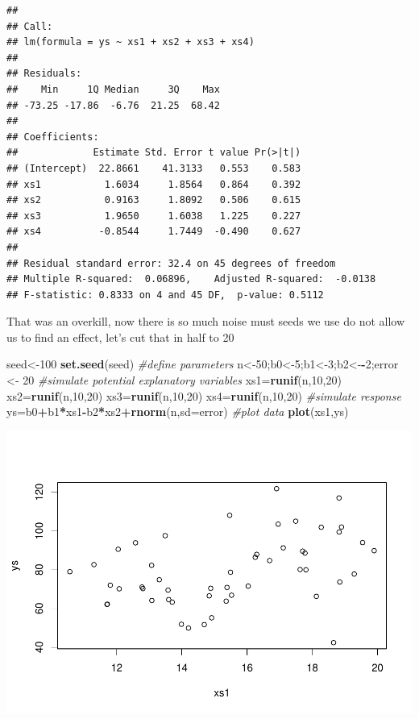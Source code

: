 \documentclass[
]{book}
\newenvironment{Shaded}{\begin{snugshade}}{\end{snugshade}}
\newcommand{\CommentTok}[1]{\textcolor[rgb]{0.56,0.35,0.01}{\textit{#1}}}
\newcommand{\DataTypeTok}[1]{\textcolor[rgb]{0.13,0.29,0.53}{#1}}
\newcommand{\DecValTok}[1]{\textcolor[rgb]{0.00,0.00,0.81}{#1}}
\newcommand{\KeywordTok}[1]{\textcolor[rgb]{0.13,0.29,0.53}{\textbf{#1}}}
\newcommand{\NormalTok}[1]{#1}
\newcommand{\OperatorTok}[1]{\textcolor[rgb]{0.81,0.36,0.00}{\textbf{#1}}}
\newcommand{\StringTok}[1]{\textcolor[rgb]{0.31,0.60,0.02}{#1}}
\begin{document}
\begin{verbatim}
## 
## Call:
## lm(formula = ys ~ xs1 + xs2 + xs3 + xs4)
## 
## Residuals:
##    Min     1Q Median     3Q    Max 
## -73.25 -17.86  -6.76  21.25  68.42 
## 
## Coefficients:
##             Estimate Std. Error t value Pr(>|t|)
## (Intercept)  22.8661    41.3133   0.553    0.583
## xs1           1.6034     1.8564   0.864    0.392
## xs2           0.9163     1.8092   0.506    0.615
## xs3           1.9650     1.6038   1.225    0.227
## xs4          -0.8544     1.7449  -0.490    0.627
## 
## Residual standard error: 32.4 on 45 degrees of freedom
## Multiple R-squared:  0.06896,	Adjusted R-squared:  -0.0138 
## F-statistic: 0.8333 on 4 and 45 DF,  p-value: 0.5112
\end{verbatim}

That was an overkill, now there is so much noise must seeds we use do not allow us to find an effect, let's cut that in half to 20

\begin{Shaded}
\begin{Highlighting}[]
\NormalTok{seed<-}\DecValTok{100}
\KeywordTok{set.seed}\NormalTok{(seed)}
\CommentTok{#define parameters}
\NormalTok{n<-}\DecValTok{50}\NormalTok{;b0<-}\DecValTok{5}\NormalTok{;b1<-}\DecValTok{3}\NormalTok{;b2<-}\OperatorTok{-}\DecValTok{2}\NormalTok{;error <-}\StringTok{ }\DecValTok{20}
\CommentTok{#simulate potential explanatory variables}
\NormalTok{xs1=}\KeywordTok{runif}\NormalTok{(n,}\DecValTok{10}\NormalTok{,}\DecValTok{20}\NormalTok{)}
\NormalTok{xs2=}\KeywordTok{runif}\NormalTok{(n,}\DecValTok{10}\NormalTok{,}\DecValTok{20}\NormalTok{)}
\NormalTok{xs3=}\KeywordTok{runif}\NormalTok{(n,}\DecValTok{10}\NormalTok{,}\DecValTok{20}\NormalTok{)}
\NormalTok{xs4=}\KeywordTok{runif}\NormalTok{(n,}\DecValTok{10}\NormalTok{,}\DecValTok{20}\NormalTok{)}
\CommentTok{#simulate response}
\NormalTok{ys=b0}\OperatorTok{+}\NormalTok{b1}\OperatorTok{*}\NormalTok{xs1}\OperatorTok{-}\NormalTok{b2}\OperatorTok{*}\NormalTok{xs2}\OperatorTok{+}\KeywordTok{rnorm}\NormalTok{(n,}\DataTypeTok{sd=}\NormalTok{error)}
\CommentTok{#plot data}
\KeywordTok{plot}\NormalTok{(xs1,ys)}
\end{Highlighting}
\end{Shaded}

\includegraphics{ECOMODbook_files/figure-latex/a7.6-1.pdf}
\end{document}
